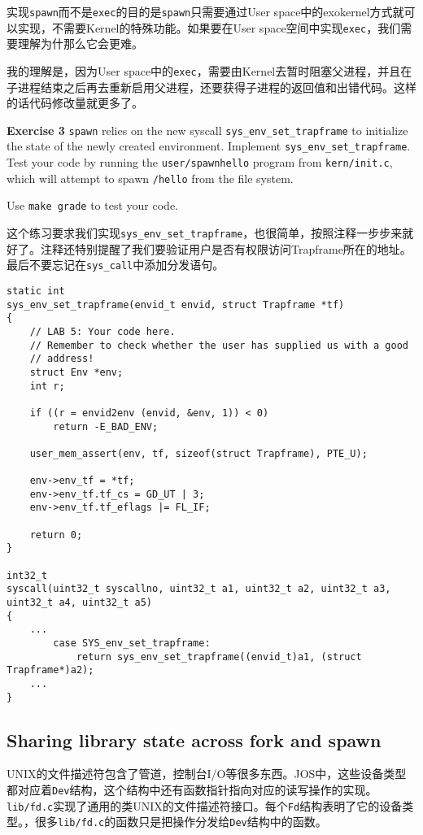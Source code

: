 \documentclass[11pt]{article}
\begin{document}
实现\lstinline|spawn|而不是\lstinline|exec|的目的是\lstinline|spawn|只需要通过User space中的exokernel方式就可以实现，不需要Kernel的特殊功能。如果要在User space空间中实现\lstinline|exec|，我们需要理解为什那么它会更难。

我的理解是，因为User space中的\lstinline|exec|，需要由Kernel去暂时阻塞父进程，并且在子进程结束之后再去重新启用父进程，还要获得子进程的返回值和出错代码。这样的话代码修改量就更多了。

\begin{framed}
\noindent\textbf{Exercise 3} \lstinline|spawn| relies on the new syscall \lstinline|sys_env_set_trapframe| to initialize the state of the newly created environment. Implement \lstinline|sys_env_set_trapframe|. Test your code by running the \lstinline|user/spawnhello| program from \lstinline|kern/init.c|, which will attempt to spawn \lstinline|/hello| from the file system.

Use \lstinline|make grade| to test your code.
\end{framed}

这个练习要求我们实现\lstinline|sys_env_set_trapframe|，也很简单，按照注释一步步来就好了。注释还特别提醒了我们要验证用户是否有权限访问Trapframe所在的地址。最后不要忘记在\lstinline|sys_call|中添加分发语句。

\begin{lstlisting}[title=kern/syscall.c]
static int
sys_env_set_trapframe(envid_t envid, struct Trapframe *tf)
{
	// LAB 5: Your code here.
	// Remember to check whether the user has supplied us with a good
	// address!
	struct Env *env;
	int r;
	
	if ((r = envid2env (envid, &env, 1)) < 0) 
		return -E_BAD_ENV; 
 
	user_mem_assert(env, tf, sizeof(struct Trapframe), PTE_U); 
 
	env->env_tf = *tf; 
	env->env_tf.tf_cs = GD_UT | 3; 
	env->env_tf.tf_eflags |= FL_IF; 
 	
 	return 0; 
}

int32_t
syscall(uint32_t syscallno, uint32_t a1, uint32_t a2, uint32_t a3, uint32_t a4, uint32_t a5)
{
	...
        case SYS_env_set_trapframe:
        	return sys_env_set_trapframe((envid_t)a1, (struct Trapframe*)a2);
	...
}
\end{lstlisting}

\subsection{Sharing library state across fork and spawn}
UNIX的文件描述符包含了管道，控制台I/O等很多东西。JOS中，这些设备类型都对应着\lstinline|Dev|结构，这个结构中还有函数指针指向对应的读写操作的实现。\lstinline|lib/fd.c|实现了通用的类UNIX的文件描述符接口。每个\lstinline|Fd|结构表明了它的设备类型。，很多\lstinline|lib/fd.c|的函数只是把操作分发给\lstinline|Dev|结构中的函数。
\end{document}
